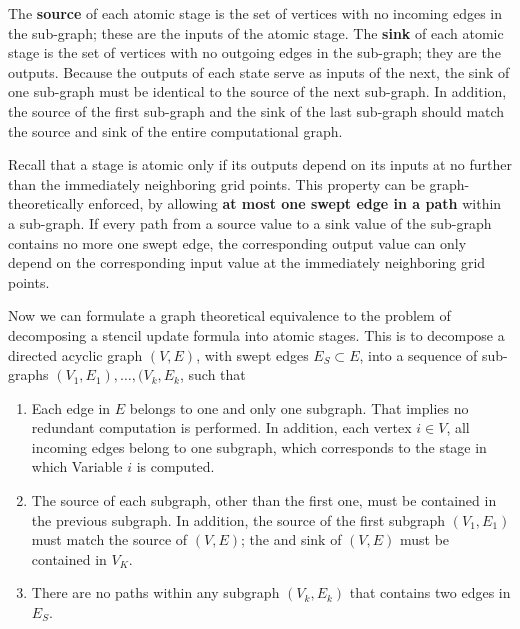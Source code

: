 \documentclass[review]{siamart0216}
\begin{document}
The {\bf source} of each atomic stage is the set of vertices
with no incoming edges in the sub-graph; these are the inputs of the
atomic stage. The {\bf sink} of each atomic stage is the set of
vertices with no outgoing edges in the sub-graph; they are the outputs.
Because the outputs of each state serve as inputs of the next, the sink of
one sub-graph must be identical to the source of the next sub-graph.
In addition, the source of the first sub-graph and the sink of the
last sub-graph should match the source and sink of the entire computational
graph.

Recall that a stage is atomic only if its outputs depend on its
inputs at no further than the immediately
neighboring grid points.  This property can be graph-theoretically enforced,
by allowing {\bf at most one swept edge in a path} within a sub-graph.
If every path from a source value to a sink value of the sub-graph
contains no more one swept edge, the corresponding output value can only
depend on the corresponding input value at the immediately neighboring
grid points.

Now we can formulate a graph theoretical equivalence to the problem of
decomposing a stencil update formula into atomic stages.  This is
to decompose a directed acyclic graph $(V,E)$, with swept edges
$E_S\subset E$, into a sequence of sub-graphs $(V_1,E_1), \ldots,
(V_{k}, E_{k}$, such that
\begin{enumerate}
    \item Each edge in $E$ belongs to one and only one subgraph.  That implies
          no redundant computation is performed.  In addition,
          each vertex $i\in V$, all incoming edges belong to one subgraph,
          which corresponds to the stage in which Variable $i$ is computed.
    \item The source of each subgraph, other than the first one,
          must be contained in the previous subgraph.
          In addition, the source of the first subgraph $(V_1,E_1)$ must
          match the source of $(V,E)$; the and sink of $(V,E)$
          must be contained in $V_K$.
    \item There are no paths within any subgraph $(V_k,E_k)$ that contains
          two edges in $E_S$.
\end{enumerate}
\end{document}
